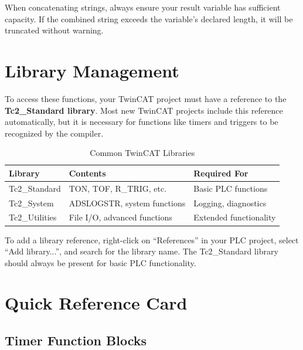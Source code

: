 \documentclass[11pt,a4paper]{article}
\begin{document}
\begin{notebox}
When concatenating strings, always ensure your result variable has sufficient capacity. If the combined string exceeds the variable's declared length, it will be truncated without warning.
\end{notebox}

\section{Library Management}

To access these functions, your TwinCAT project must have a reference to the \textbf{Tc2\_Standard library}. Most new TwinCAT projects include this reference automatically, but it is necessary for functions like timers and triggers to be recognized by the compiler.

\begin{table}[h]
\centering
\begin{tabular}{@{}lll@{}}
\toprule
\textbf{Library} & \textbf{Contents} & \textbf{Required For} \\
\midrule
Tc2\_Standard & TON, TOF, R\_TRIG, etc. & Basic PLC functions \\
Tc2\_System & ADSLOGSTR, system functions & Logging, diagnostics \\
Tc2\_Utilities & File I/O, advanced functions & Extended functionality \\
\bottomrule
\end{tabular}
\caption{Common TwinCAT Libraries}
\end{table}

\begin{tipbox}
To add a library reference, right-click on ``References'' in your PLC project, select ``Add library...'', and search for the library name. The Tc2\_Standard library should always be present for basic PLC functionality.
\end{tipbox}

\section*{Quick Reference Card}

\subsection*{Timer Function Blocks}
\end{document}
